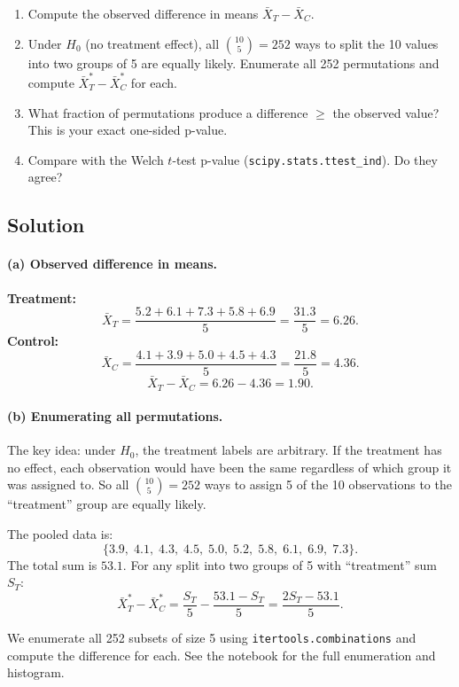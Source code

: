 \documentclass[11pt]{article}
\begin{document}
\begin{enumerate}[label=\alph*)]
  \item Compute the observed difference in means $\bar{X}_T - \bar{X}_C$.
  \item Under $H_0$ (no treatment effect), all $\binom{10}{5} = 252$ ways to split the 10 values into two groups of 5 are equally likely. Enumerate all 252 permutations and compute $\bar{X}_T^* - \bar{X}_C^*$ for each.
  \item What fraction of permutations produce a difference $\geq$ the observed value? This is your exact one-sided p-value.
  \item Compare with the Welch $t$-test p-value (\texttt{scipy.stats.ttest\_ind}). Do they agree?
\end{enumerate}

\subsection*{Solution}

\paragraph{(a) Observed difference in means.}

\textbf{Treatment:}
\[
  \bar{X}_T = \frac{5.2 + 6.1 + 7.3 + 5.8 + 6.9}{5} = \frac{31.3}{5} = 6.26.
\]
\textbf{Control:}
\[
  \bar{X}_C = \frac{4.1 + 3.9 + 5.0 + 4.5 + 4.3}{5} = \frac{21.8}{5} = 4.36.
\]
\[
  \boxed{\bar{X}_T - \bar{X}_C = 6.26 - 4.36 = 1.90}.
\]

\paragraph{(b) Enumerating all permutations.}

The key idea: under $H_0$, the treatment labels are arbitrary. If the treatment has no effect, each observation would have been the same regardless of which group it was assigned to. So all $\binom{10}{5} = 252$ ways to assign 5 of the 10 observations to the ``treatment'' group are equally likely.

The pooled data is:
\[
  \{3.9,\; 4.1,\; 4.3,\; 4.5,\; 5.0,\; 5.2,\; 5.8,\; 6.1,\; 6.9,\; 7.3\}.
\]
The total sum is $53.1$. For any split into two groups of 5 with ``treatment'' sum $S_T$:
\[
  \bar{X}_T^* - \bar{X}_C^* = \frac{S_T}{5} - \frac{53.1 - S_T}{5} = \frac{2S_T - 53.1}{5}.
\]

We enumerate all 252 subsets of size 5 using \texttt{itertools.combinations} and compute the difference for each. See the notebook for the full enumeration and histogram.
\end{document}

